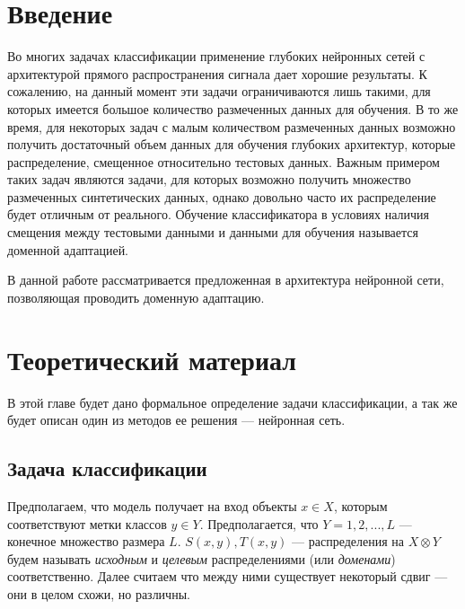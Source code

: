 \documentclass[14pt]{extarticle}
\begin{document}
\newpage

\tableofcontents

\newpage

\section*{Введение}

Во многих задачах классификации применение глубоких нейронных сетей с архитектурой прямого распространения сигнала дает хорошие результаты. К сожалению, на данный момент эти задачи ограничиваются лишь такими, для которых имеется большое количество размеченных данных для обучения. В то же время, для некоторых задач с малым количеством размеченных данных возможно получить достаточный объем данных для обучения глубоких архитектур, которые распределение, смещенное относительно тестовых данных.
Важным примером таких задач являются задачи, для которых возможно получить множество размеченных синтетических данных, однако довольно часто их распределение будет отличным от реального. Обучение классификатора в условиях наличия смещения между тестовыми данными и данными для обучения называется доменной адаптацией.

В данной работе рассматривается предложенная в \cite{ganin} архитектура нейронной сети, позволяющая проводить доменную адаптацию.


\newpage
\section{Теоретический материал}

В этой главе будет дано формальное определение задачи классификации, а так же будет описан один из методов ее решения — нейронная сеть.

\subsection{Задача классификации}

Предполагаем, что модель получает на вход объекты $x \in X$, которым соответствуют метки классов $y \in Y$. Предполагается, что $Y = {1, 2, ..., L}$ — конечное множество размера $L$. $S(x,y), T(x,y)$ — распределения на $X \otimes Y$ будем называть \textit{исходным} и \textit{целевым} распределениями (или \textit{доменами}) соответственно. Далее считаем что между ними существует некоторый сдвиг — они в целом схожи, но различны.
\end{document}
